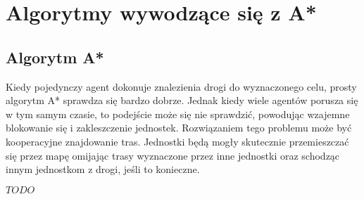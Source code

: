 \chapter{Algorytmy wywodzące się z A*}
\label{ch:astar}

\section{Algorytm A*}
Kiedy pojedynczy agent dokonuje znalezienia drogi do wyznaczonego celu, prosty algorytm A* sprawdza się bardzo dobrze. Jednak kiedy wiele agentów porusza się w tym samym czasie, to podejście może się nie sprawdzić, powodując wzajemne blokowanie się i zakleszczenie jednostek. Rozwiązaniem tego problemu może być kooperacyjne znajdowanie tras. Jednostki będą mogły skutecznie przemieszczać się przez mapę omijając trasy wyznaczone przez inne jednostki oraz schodząc innym jednostkom z drogi, jeśli to konieczne. \cite{cooppath}




$TODO$
